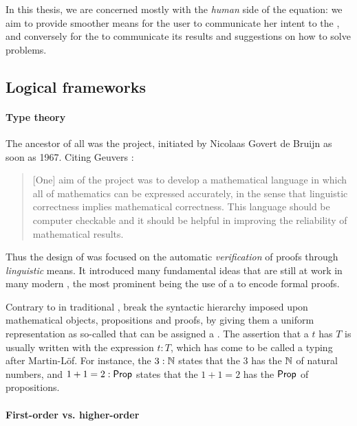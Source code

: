 \begin{emphpar}
In this thesis, we are concerned mostly with the \emph{human} side of the
equation: we aim to provide smoother means for the user to communicate her
intent to the , and conversely for the 
to communicate its results and suggestions on how to solve problems.
\end{emphpar}

\subsection{Logical frameworks}

\paragraph{Type theory}

\AP
The ancestor of all  was the  project,
initiated by Nicolaas Govert de Bruijn as soon as 1967. Citing Geuvers
:
\begin{quote}
[One] aim of the project was to develop a mathematical language in which all of
mathematics can be expressed accurately, in the sense that linguistic
correctness implies mathematical correctness. This language should be computer
checkable and it should be helpful in improving the reliability of mathematical
results.
\end{quote}
\AP
Thus the design of  was focused on the automatic
\emph{verification} of proofs through \emph{linguistic} means. It introduced
many fundamental ideas that are still at work in many modern , the most prominent being the use of a  to encode
formal proofs.

\AP Contrary to  in traditional ,  break the syntactic hierarchy imposed upon mathematical objects,
propositions and proofs, by giving them a uniform representation as so-called
 that can be assigned a . The assertion that a
 $t$ has  $T$ is usually written with the expression $t : T$,
which has come to be called a typing  after Martin-Löf. For
instance, the  $3 : \mathbb{N}$ states that the  $3$ has the
 $\mathbb{N}$ of natural numbers, and $1 + 1 = 2 : \mathsf{Prop}$ states that the
 $1 + 1 = 2$ has the  $\mathsf{Prop}$ of propositions.

\paragraph{First-order vs. higher-order}


